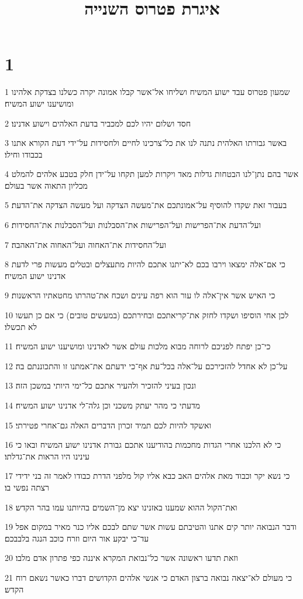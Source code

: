 

\title{איגרת פטרוס השנייה}


\chapter{1}

\par 1 שמעון פטרוס עבד ישוע המשיח ושליחו אל־אשר קבלו אמונה יקרה כשלנו בצדקת אלהינו ומושיענו ישוע המשיח׃
\par 2 חסד ושלום יהיו לכם למכביר בדעת האלהים וישוע אדנינו׃
\par 3 באשר גבורתו האלהית נתנה לנו את כל־צרכינו לחיים ולחסידות על־ידי דעת הקורא אתנו בכבודו וחילו׃
\par 4 אשר בהם נתן־לנו הבטחות גדלות מאד ויקרות למען תקחו על־ידן חלק בטבע אלהים להמלט מכליון התאוה אשר בעולם׃
\par 5 בעבור זאת שקדו להוסיף על־אמונתכם את־מעשה הצדקה ועל מעשה הצדקה את־הדעת׃
\par 6 ועל־הדעת את־הפרישות ועל־הפרישות את־הסבלנות ועל־הסבלנות את־החסידות׃
\par 7 ועל־החסידות את־האחוה ועל־האחוה את־האהבה׃
\par 8 כי אם־אלה ימצאו וירבו בכם לא־יתנו אתכם להיות מתעצלים ובטלים מעשות פרי לדעת אדנינו ישוע המשיח׃
\par 9 כי האיש אשר אין־אלה לו עור הוא רפה עינים ושכח את־טהרתו מחטאתיו הראשנות׃
\par 10 לכן אחי הוסיפו ושקדו לחזק את־קריאתכם ובחירתכם (במעשים טובים) כי אם כן תעשו לא תכשלו׃
\par 11 כי־כן יפתח לפניכם לרוחה מבוא מלכות עולם אשר לאדנינו ומושיענו ישוע המשיח׃
\par 12 על־כן לא אחדל להזכירכם על־אלה בכל־עת אף־כי ידעתם את־אמתנו זו והתכוננתם בה׃
\par 13 ונכון בעיני להזכיר ולהעיר אתכם כל־ימי היותי במשכן הזה׃
\par 14 מדעתי כי מהר יעתק משכני וכן גלה־לי אדנינו ישוע המשיח׃
\par 15 ואשקד להיות לכם תמיד זכרון הדברים האלה גם־אחרי פטירתי׃
\par 16 כי לא הלכנו אחרי הגדות מחכמות בהודיענו אתכם גבורת אדנינו ישוע המשיח ובאו כי עינינו היו הראות את־גדלתו׃
\par 17 כי נשא יקר וכבוד מאת אלהים האב כבא אליו קול מלפני הדרת כבודו לאמר זה בני ידידי רצתה נפשי בו׃
\par 18 ואת־הקול ההוא שמענו באזנינו יצא מן־השמים בהיותנו עמו בהר הקדש׃
\par 19 ודבר הנבואה יותר קים אתנו והטיבתם עשות אשר שתם לבכם אליו כנר מאיר במקום אפל עד־כי יבקע אור היום וזרח כוכב הנגה בלבבכם׃
\par 20 וזאת תדעו ראשונה אשר כל־נבואת המקרא איננה כפי פתרון אדם מלבו׃
\par 21 כי מעולם לא־יצאה נבואה ברצון האדם כי אנשי אלהים הקדושים דברו כאשר נשאם רוח הקדש׃

